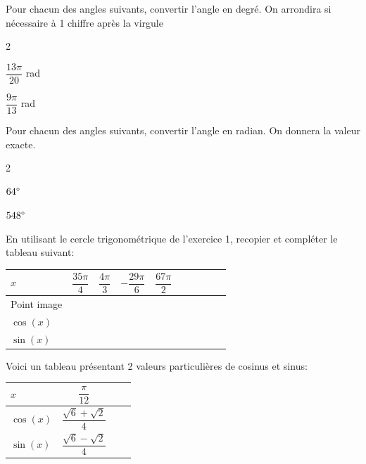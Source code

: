 \documentclass[11pt,a4paper]{article}  %
\begin{document}
Pour chacun des angles suivants, convertir l'angle en degré. On arrondira si nécessaire à 1 chiffre après la virgule
\begin{multicols}{2}
	\begin{enumMet}
		\item $\dfrac{13\pi}{20}$ rad
		\item $\dfrac{9\pi}{13}$ rad
	\end{enumMet}
\end{multicols}

Pour chacun des angles suivants, convertir l'angle en radian. On donnera la valeur exacte.
\begin{multicols}{2}
	\begin{enumMet}
		\item $64\degree$
		\item $548\degree$
	\end{enumMet}
\end{multicols}


En utilisant le cercle trigonométrique de l'exercice 1, recopier et compléter le tableau suivant:\\
\begin{center}
	\begin{tabular}{ | Xc | Xc | Xc | Xc | Xc | }
		\hline
		$x$  & $\dfrac{35\pi}{4}$ & $\dfrac{4\pi}{3}$ & $-\dfrac{29\pi}{6}$ &  $\dfrac{67\pi}{2}$ \rule[-12pt]{0pt}{33pt}\\ \hline
		Point image  &   &   &   &   \\ \hline
		$\cos(x)$  &   &   &   &   \\ \hline
		$\sin(x)$ &   &   &   &   \\
		\hline  
	\end{tabular}
\end{center}


Voici un tableau présentant 2 valeurs particulières de cosinus et sinus:\\
\begin{center}
	\begin{tabular}{ | Xc | Xc | }
		\hline
		$x$  & $\dfrac{\pi}{12}$ \rule[-12pt]{0pt}{33pt}\\ \hline
		$\cos(x)$  & $\dfrac{\sqrt{6}+\sqrt{2}}{4}$ \rule[-12pt]{0pt}{33pt}\\ \hline
		$\sin(x)$ & $\dfrac{\sqrt{6}-\sqrt{2}}{4}$  \rule[-12pt]{0pt}{33pt}\\
		\hline  
	\end{tabular}
\end{center}
\end{document}
